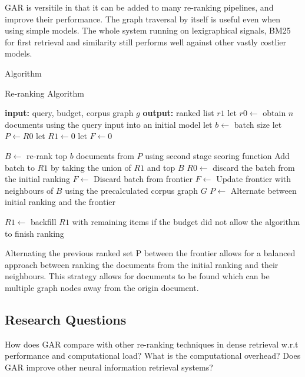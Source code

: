 \documentclass[sigconf,authorversion,nonacm]{acmart}
\begin{document}
GAR is versitile in that it can be added to many re-ranking pipelines, and improve their
performance. The graph traversal by itself is useful even when using simple models. The whole
system running on lexigraphical signals, BM25 for first retrieval and similarity still performs
well against other vastly costlier models.

Algorithm
\begin{algorithm}
	\caption{Re-ranking Algorithm}
	\begin{algorithmic}[1]
		\STATE \textbf{input:} query, budget, corpus graph \(g\)
		\STATE \textbf{output:} ranked list \(r1\)
		\STATE let \(r0 \leftarrow\) obtain \(n\) documents using the query input into an initial model
		\STATE let \(b \leftarrow\) batch size
		\STATE let \(P \leftarrow R0 \)
		\STATE let \(R1 \leftarrow 0 \)
		\STATE let \(F \leftarrow 0 \)

		\STATE \(B \leftarrow\) re-rank top \(b\) documents from \(P\) using second stage scoring function
		\STATE Add batch to \(R1\) by taking the union of \(R1\) and top \(B\)
		\STATE \(R0 \leftarrow\) discard the batch from the initial ranking
		\STATE \(F \leftarrow\) Discard batch from frontier
		\STATE \(F \leftarrow\) Update frontier with neighbours of \(B\) using the precalculated corpus graph \(G\)
		\STATE \(P \leftarrow\) Alternate between initial ranking and the frontier
		\ENDWHILE

		\STATE \(R1 \leftarrow\) backfill \(R1\) with remaining items if the budget did not allow the algorithm to finish ranking
	\end{algorithmic}
\end{algorithm}

Alternating the previous ranked set P between the frontier allows for a balanced approach between
ranking the documents from the initial ranking and their neighbours. This strategy allows for
documents to be found which can be multiple graph nodes away from the origin document.
\subsection{Research Questions}

How does GAR compare with other re-ranking techniques in dense retrieval w.r.t performance and
computational load?
What is the computational overhead?
Does GAR improve other neural information retrieval systems?

\end{document}
